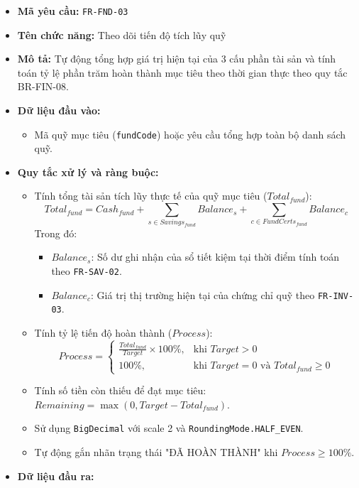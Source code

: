 \documentclass[11pt,a4paper]{article}
\providecommand{\tightlist}{
  \setlength{\itemsep}{0pt}\setlength{\parskip}{0pt}}
\begin{document}
\begin{itemize}
\tightlist
\item
  \textbf{Mã yêu cầu:} \texttt{FR-FND-03}
\item
  \textbf{Tên chức năng:} Theo dõi tiến độ tích lũy quỹ
\item
  \textbf{Mô tả:} Tự động tổng hợp giá trị hiện tại của 3 cấu phần tài
  sản và tính toán tỷ lệ phần trăm hoàn thành mục tiêu theo thời gian
  thực theo quy tắc BR-FIN-08.
\item
  \textbf{Dữ liệu đầu vào:}

  \begin{itemize}
  \tightlist
  \item
    Mã quỹ mục tiêu (\texttt{fundCode}) hoặc yêu cầu tổng hợp toàn bộ
    danh sách quỹ.
  \end{itemize}
\item
  \textbf{Quy tắc xử lý và ràng buộc:}

  \begin{itemize}
  \tightlist
  \item
    Tính tổng tài sản tích lũy thực tế của quỹ mục tiêu
    (\(Total_{fund}\)):
    \[Total_{fund} = Cash_{fund} + \sum_{s \in Savings_{fund}} Balance_s + \sum_{c \in FundCerts_{fund}} Balance_c\]
    Trong đó:

    \begin{itemize}
    \tightlist
    \item
      \(Balance_s\): Số dư ghi nhận của sổ tiết kiệm tại thời điểm tính
      toán theo \texttt{FR-SAV-02}.
    \item
      \(Balance_c\): Giá trị thị trường hiện tại của chứng chỉ quỹ theo
      \texttt{FR-INV-03}.
    \end{itemize}
  \item
    Tính tỷ lệ tiến độ hoàn thành (\(Process\)):
    \[Process = \begin{cases} \frac{Total_{fund}}{Target} \times 100\%, & \text{khi } Target > 0 \\ 100\%, & \text{khi } Target = 0 \text{ và } Total_{fund} \ge 0 \end{cases}\]
  \item
    Tính số tiền còn thiếu để đạt mục tiêu:
    \(Remaining = \max(0, Target - Total_{fund})\).
  \item
    Sử dụng \texttt{BigDecimal} với scale 2 và
    \texttt{RoundingMode.HALF\_EVEN}.
  \item
    Tự động gắn nhãn trạng thái "ĐÃ HOÀN THÀNH" khi
    \(Process \ge 100\%\).
  \end{itemize}
\item
  \textbf{Dữ liệu đầu ra:}


\end{itemize}
\end{document}
